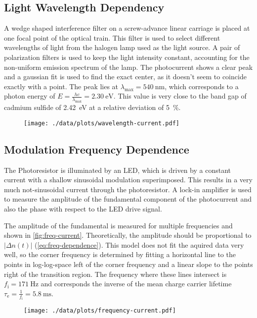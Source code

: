 \subsection{Light Wavelength Dependency}
A wedge shaped interference filter on a screw-advance linear carriage is placed at one focal point of the optical train.
This filter is used to select different wavelengths of light from the halogen lamp used as the light source.
A pair of polarization filters is used to keep the light intensity constant, accounting for the non-uniform emission spectrum of the lamp.
The photocurrent shows a clear peak and a gaussian fit is used to find the exact center, as it doesn't seem to coincide exactly with a point.
The peak lies at $\lambda_\text{max} = \SI{540}{\nano\meter}$, which corresponds to a photon energy of $E = \frac{h c}{\lambda_\text{max}} = \SI{2.30}{\electronvolt}$.
This value is very close to the band gap of cadmium sulfide of \SI{2.42}{\electronvolt} at a relative deviation of \SI{5}{\percent}.
\begin{figure}
	\centering
	\texttt{[image: ./data/plots/wavelength-current.pdf]}
	\label{fig:freq-current}
\end{figure}

\subsection{Modulation Frequency Dependence}
The Photoresistor is illuminated by an LED, which is driven by a constant current with a shallow sinusoidal modulation superimposed.
This results in a very much not-sinusoidal current through the photoresistor.
A lock-in amplifier is used to measure the amplitude of the fundamental component of the photocurrent and also the phase with respect to the LED drive signal.

The amplitude of the fundamental is measured for multiple frequencies and shown in \autoref{fig:freq-current}.
Theoretically, the amplitude should be proportional to $|\Delta n(t)|$ (\autoref{eq:freq-dependence}).
This model does not fit the aquired data very well, so the corner frequency is determined by fitting a horizontal line to the points in log-log-space left of the corner frequency and a linear slope to the points right of the transition region.
The frequency where these lines intersect is $f_\text{i} = \SI{171}{\hertz}$ and corresponds the inverse of the mean charge carrier lifetime $\tau_\text{e} = \frac{1}{f_\text{i}} = \SI{5.8}{\milli\second}$.
\begin{figure}
	\centering
	\texttt{[image: ./data/plots/frequency-current.pdf]}
	\label{fig:freq-current}
\end{figure}
